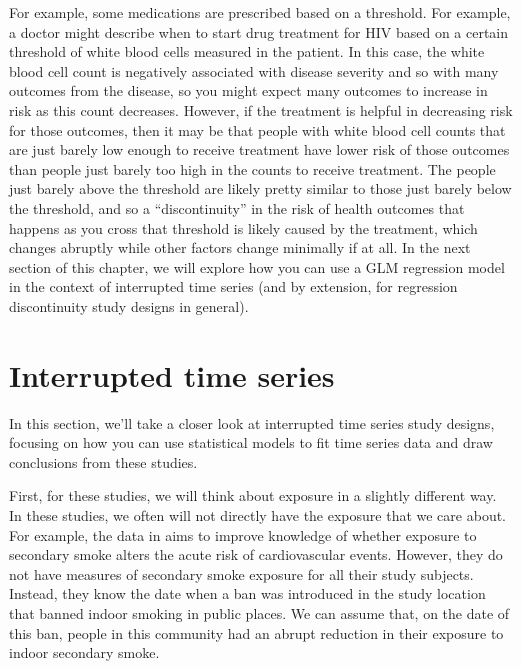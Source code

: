 \documentclass[
]{book}
\begin{document}
For example, some medications are prescribed based on a threshold. For example, a doctor might describe when to start drug treatment for HIV based on a certain threshold of white blood cells measured in the patient. In this case, the white blood cell count is negatively associated with disease severity and so with many outcomes from the disease, so you might expect many outcomes to increase in risk as this count decreases. However, if the treatment is helpful in decreasing risk for those outcomes, then it may be that people with white blood cell counts that are just barely low enough to receive treatment have lower risk of those outcomes than people just barely too high in the counts to receive treatment. The people just barely above the threshold are likely pretty similar to those just barely below the threshold, and so a ``discontinuity'' in the risk of health outcomes that happens as you cross that threshold is likely caused by the treatment, which changes abruptly while other factors change minimally if at all. In the next section of this chapter, we will explore how you can use a GLM regression model in the context of interrupted time series (and by extension, for regression discontinuity study designs in general).

\hypertarget{interrupted-time-series}{%
\section{Interrupted time series}\label{interrupted-time-series}}

In this section, we'll take a closer look at interrupted time series study designs, focusing on how you can use statistical models to fit time series data and draw conclusions from these studies.

First, for these studies, we will think about exposure in a slightly different way. In these studies, we often will not directly have the exposure that we care about. For example, the data in \citet{bernal2017interrupted} aims to improve knowledge of whether exposure to secondary smoke alters the acute risk of cardiovascular events. However, they do not have measures of secondary smoke exposure for all their study subjects. Instead, they know the date when a ban was introduced in the study location that banned indoor smoking in public places. We can assume that, on the date of this ban, people in this community had an abrupt reduction in their exposure to indoor secondary smoke.
\end{document}
